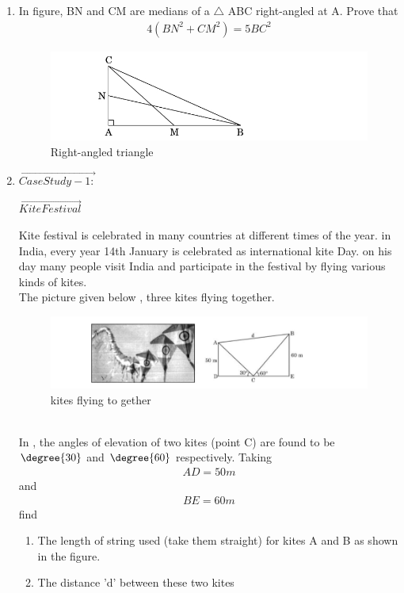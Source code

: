 \begin{enumerate}[label=\thesection.\arabic*.,ref=\thesection.\theenumi]
\item In figure, BN and CM are medians of a $\triangle$ ABC right-angled at A. Prove that \begin{align}4(BN^2 +CM^2) = 5BC^2\end{align} 
\begin{figure}[!ht]
\centering
\includegraphics[width=\columnwidth]{figs/rightangled}
\caption{Right-angled triangle}
\label{fig:rightangled4}
\end{figure}
\item $\vec{Case Study - 1:}$
\begin{center}
$\vec{Kite Festival}$\\
\end{center}
Kite festival is celebrated in many countries at different times of the year. in India, every year 14th
January is celebrated as international kite Day. on his day many people visit India and participate in the festival by flying various kinds of kites.
\\The picture given below  , three kites flying together.
\begin{figure}[!ht]
\centering
\includegraphics[width=\columnwidth]{figs/kites}
\caption{kites flying to gether}
\label{fig:kites5}
\end{figure}
\\In {}, the angles of elevation of two kites (point C) are found to be $\degree{30}$ and  $\degree{60}$ respectively. Taking \begin{align}AD = 50 m\end{align} and\begin{align} BE = 60 m\end{align}
find 
\begin{enumerate}
\item The length of string used (take them straight) for kites A and B as shown in the figure.
\item The distance 'd' between these two kites
\end{enumerate}
\end{enumerate}
	
